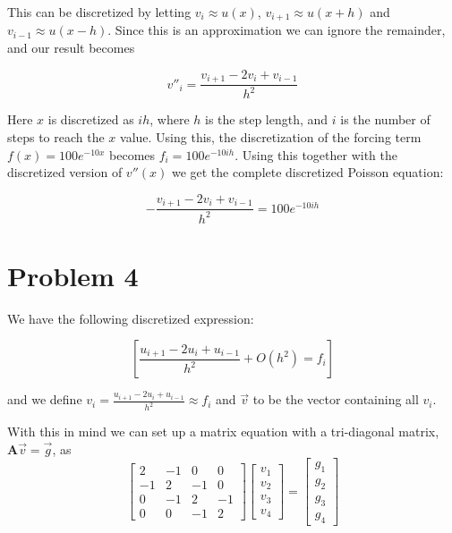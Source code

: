 \documentclass[english,notitlepage]{article}  %
\begin{document}
    This can be discretized by letting $v_i \approx u(x)$, $v_{i+1} \approx u(x+h)$
    and $v_{i-1} \approx u(x-h)$. Since this is an approximation we can ignore the
    remainder, and our result becomes

    \begin{equation*}
        v''_i = \frac{v_{i+1} - 2v_i + v_{i-1}}{h^2}
    \end{equation*}

    Here $x$ is discretized as $i h$, where $h$ is the step length, and $i$ is the
    number of steps to reach the $x$ value. Using this, the discretization of the
    forcing term $f(x) = 100 e^{-10 x}$ becomes $f_i = 100 e^{-10 ih}$. Using this
    together with the discretized version of $v''(x)$ we get the complete
    discretized Poisson equation:

    \begin{equation}
        -\frac{v_{i+1} - 2v_i + v_{i-1}}{h^2} = 100 e^{-10 i h}
    \end{equation}

\section*{Problem 4}

    We have the following discretized expression:

    \begin{equation}\label{eq:second_derr}
        \left[\frac{u_{i+1} - 2u_i + u_{i-1}}{h^2} + O(h^2) = f_i\right]
    \end{equation}

    and we define $v_i = \frac{u_{i+1} - 2u_i + u_{i-1}}{h^2} \approx f_i$ and $\vec{v}$ to be the vector containing all $v_i$.

    With this in mind we can set up a matrix equation with a tri-diagonal matrix, $\boldsymbol{A}\vec{v} = \vec{g}$, as
    \begin{equation}\label{eq:mat_Avg}
        \begin{bmatrix}
            2 & -1 & 0 & 0 \\
            -1 & 2 & -1 & 0 \\
            0 & -1 & 2 & -1 \\
            0 & 0 & -1 & 2
        \end{bmatrix} \begin{bmatrix}
            v_1\\
            v_2\\
            v_3\\
            v_4
        \end{bmatrix} = \begin{bmatrix}
            g_1\\
            g_2\\
            g_3\\
            g_4
        \end{bmatrix}
    \end{equation}
\end{document}
